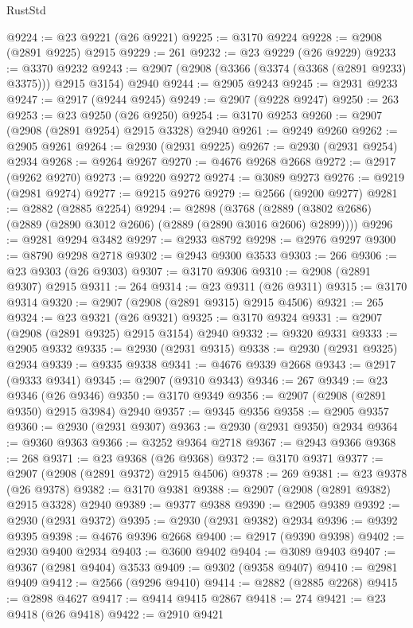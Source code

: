 \begin{lexlean}{RustStd}
\begin{coremodule}
@9224 := @23 @9221 (@26 @9221)
@9225 := @3170 @9224
@9228 := @2908 (@2891 @9225) @2915
@9229 := 261
@9232 := @23 @9229 (@26 @9229)
@9233 := @3370 @9232
@9243 := @2907 (@2908 (@3366 (@3374 (@3368 (@2891 @9233) @3375))) @2915 @3154) @2940
@9244 := @2905 @9243
@9245 := @2931 @9233
@9247 := @2917 (@9244 @9245)
@9249 := @2907 (@9228 @9247)
@9250 := 263
@9253 := @23 @9250 (@26 @9250)
@9254 := @3170 @9253
@9260 := @2907 (@2908 (@2891 @9254) @2915 @3328) @2940
@9261 := @9249 @9260
@9262 := @2905 @9261
@9264 := @2930 (@2931 @9225)
@9267 := @2930 (@2931 @9254) @2934
@9268 := @9264 @9267
@9270 := @4676 @9268 @2668
@9272 := @2917 (@9262 @9270)
@9273 := @9220 @9272
@9274 := @3089 @9273
@9276 := @9219 (@2981 @9274)
@9277 := @9215 @9276
@9279 := @2566 (@9200 @9277)
@9281 := @2882 (@2885 @2254)
@9294 := @2898
    (@3768 (@2889 (@3802 @2686) (@2889 (@2890 @3012 @2606) (@2889 (@2890 @3016 @2606) @2899))))
@9296 := @9281 @9294 @3482
@9297 := @2933 @8792
@9298 := @2976 @9297
@9300 := @8790 @9298 @2718
@9302 := @2943 @9300 @3533
@9303 := 266
@9306 := @23 @9303 (@26 @9303)
@9307 := @3170 @9306
@9310 := @2908 (@2891 @9307) @2915
@9311 := 264
@9314 := @23 @9311 (@26 @9311)
@9315 := @3170 @9314
@9320 := @2907 (@2908 (@2891 @9315) @2915 @4506)
@9321 := 265
@9324 := @23 @9321 (@26 @9321)
@9325 := @3170 @9324
@9331 := @2907 (@2908 (@2891 @9325) @2915 @3154) @2940
@9332 := @9320 @9331
@9333 := @2905 @9332
@9335 := @2930 (@2931 @9315)
@9338 := @2930 (@2931 @9325) @2934
@9339 := @9335 @9338
@9341 := @4676 @9339 @2668
@9343 := @2917 (@9333 @9341)
@9345 := @2907 (@9310 @9343)
@9346 := 267
@9349 := @23 @9346 (@26 @9346)
@9350 := @3170 @9349
@9356 := @2907 (@2908 (@2891 @9350) @2915 @3984) @2940
@9357 := @9345 @9356
@9358 := @2905 @9357
@9360 := @2930 (@2931 @9307)
@9363 := @2930 (@2931 @9350) @2934
@9364 := @9360 @9363
@9366 := @3252 @9364 @2718
@9367 := @2943 @9366
@9368 := 268
@9371 := @23 @9368 (@26 @9368)
@9372 := @3170 @9371
@9377 := @2907 (@2908 (@2891 @9372) @2915 @4506)
@9378 := 269
@9381 := @23 @9378 (@26 @9378)
@9382 := @3170 @9381
@9388 := @2907 (@2908 (@2891 @9382) @2915 @3328) @2940
@9389 := @9377 @9388
@9390 := @2905 @9389
@9392 := @2930 (@2931 @9372)
@9395 := @2930 (@2931 @9382) @2934
@9396 := @9392 @9395
@9398 := @4676 @9396 @2668
@9400 := @2917 (@9390 @9398)
@9402 := @2930 @9400 @2934
@9403 := @3600 @9402
@9404 := @3089 @9403
@9407 := @9367 (@2981 @9404) @3533
@9409 := @9302 (@9358 @9407)
@9410 := @2981 @9409
@9412 := @2566 (@9296 @9410)
@9414 := @2882 (@2885 @2268)
@9415 := @2898 @4627
@9417 := @9414 @9415 @2867
@9418 := 274
@9421 := @23 @9418 (@26 @9418)
@9422 := @2910 @9421

\end{coremodule}
\end{lexlean}
